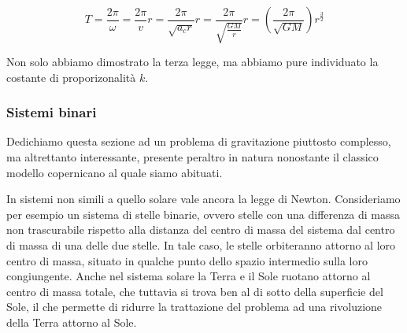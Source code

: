 \[ T = \frac{2\pi}{\omega} = \frac{2\pi}{v}r = \frac{2\pi}{\sqrt{a_c r}}r = \frac{2\pi}{\sqrt{\frac{GM}{r}}}r = \left(\frac{2\pi}{\sqrt{GM}}\right)r^\frac{3}{2} \]

\noindent Non solo abbiamo dimostrato la terza legge, ma abbiamo pure individuato la
costante di proporizonalità $k$.

\subsubsection*{Sistemi binari}
Dedichiamo questa sezione ad un problema di gravitazione piuttosto complesso,
ma altrettanto interessante, presente peraltro in natura nonostante il classico
modello copernicano al quale siamo abituati.

In sistemi non simili a quello solare vale ancora la legge di Newton. Consideriamo
per esempio un sistema di stelle binarie, ovvero stelle con una differenza di massa
non trascurabile rispetto alla distanza del centro di massa del sistema dal centro
di massa di una delle due stelle. In tale caso, le stelle orbiteranno attorno al
loro centro di massa, situato in qualche punto dello spazio intermedio sulla loro
congiungente. Anche nel sistema solare la Terra e il Sole ruotano attorno al centro
di massa totale, che tuttavia si trova ben al di sotto della superficie del Sole,
il che permette di ridurre la trattazione del problema ad una rivoluzione della
Terra attorno al Sole.